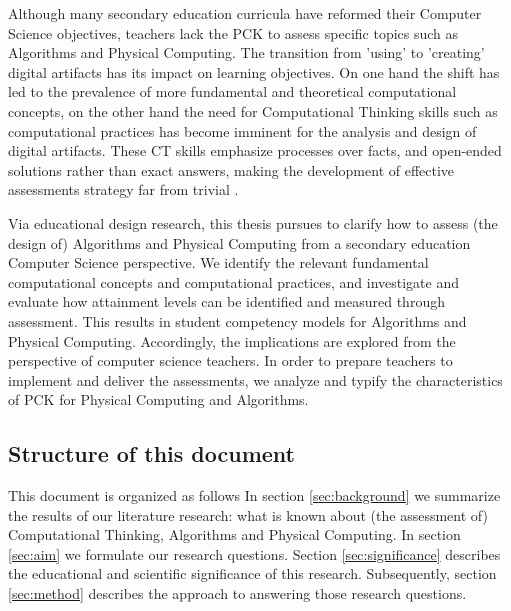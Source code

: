 Although many secondary education curricula have reformed their Computer Science objectives, teachers lack the PCK to assess specific topics such as Algorithms and Physical Computing. The transition from 'using' to 'creating' digital artifacts has its impact on learning objectives. On one hand the shift has led to the prevalence of more fundamental and theoretical computational concepts, on the other hand the need for Computational Thinking skills such as computational practices has become imminent for the analysis and design of digital artifacts. These CT skills emphasize processes over facts, and open-ended solutions rather than exact answers, making the development of effective assessments strategy far from trivial \cite{rodriguez2017assessingCTunplugged}.

Via educational design research, this thesis pursues to clarify how to assess (the design of) Algorithms and Physical Computing from a secondary education Computer Science perspective. We identify the relevant fundamental computational concepts and computational practices, and investigate and evaluate how attainment levels can be identified and measured through assessment. This results in student competency models for Algorithms and Physical Computing. Accordingly, the implications are explored from the perspective of computer science teachers. In order to prepare teachers to implement and deliver the assessments, we analyze and typify the characteristics of PCK for Physical Computing and Algorithms.


\subsection{Structure of this document}
This document is organized as follows
In section \ref{sec:background} we summarize the results of our literature research: what is known about (the assessment of) Computational Thinking, Algorithms and Physical Computing. In section \ref{sec:aim} we formulate our research questions. Section \ref{sec:significance} describes the educational and scientific significance of this research. Subsequently, section \ref{sec:method} describes the approach to answering those research questions. 